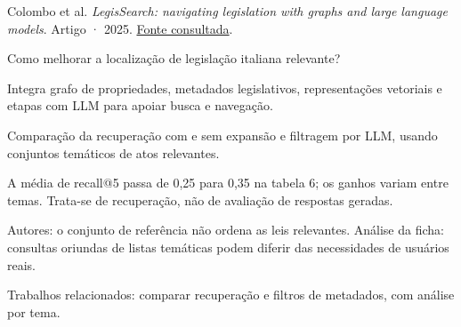 {\small Colombo et al. \textit{LegisSearch: navigating legislation with graphs and large language models}. Artigo · 2025. \href{https://link.springer.com/content/pdf/10.1007/s10506-025-09482-6.pdf}{Fonte consultada}.\par}

Como melhorar a localização de legislação italiana relevante?

Integra grafo de propriedades, metadados legislativos, representações vetoriais e etapas com LLM para apoiar busca e navegação.

Comparação da recuperação com e sem expansão e filtragem por LLM, usando conjuntos temáticos de atos relevantes.

A média de recall@5 passa de 0,25 para 0,35 na tabela 6; os ganhos variam entre temas. Trata-se de recuperação, não de avaliação de respostas geradas.

\begin{itemize}
\end{itemize}

Autores: o conjunto de referência não ordena as leis relevantes. Análise da ficha: consultas oriundas de listas temáticas podem diferir das necessidades de usuários reais.

Trabalhos relacionados: comparar recuperação e filtros de metadados, com análise por tema.

